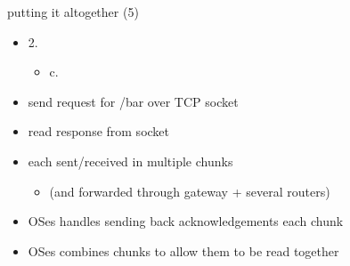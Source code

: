 \begin{frame}{putting it altogether (5)}
    \begin{itemize}
    \item 2. 
        \begin{itemize}
        \item c. 
        \end{itemize}
    \vspace{.5cm}
    \item send request for /bar over TCP socket
    \item read response from socket
    \vspace{.5cm}
    \item each sent/received in multiple chunks
        \begin{itemize}
        \item (and forwarded through gateway + several routers)
        \end{itemize}
    \item OSes handles sending back acknowledgements each chunk
    \item OSes combines chunks to allow them to be read together
    \end{itemize}
\end{frame}

